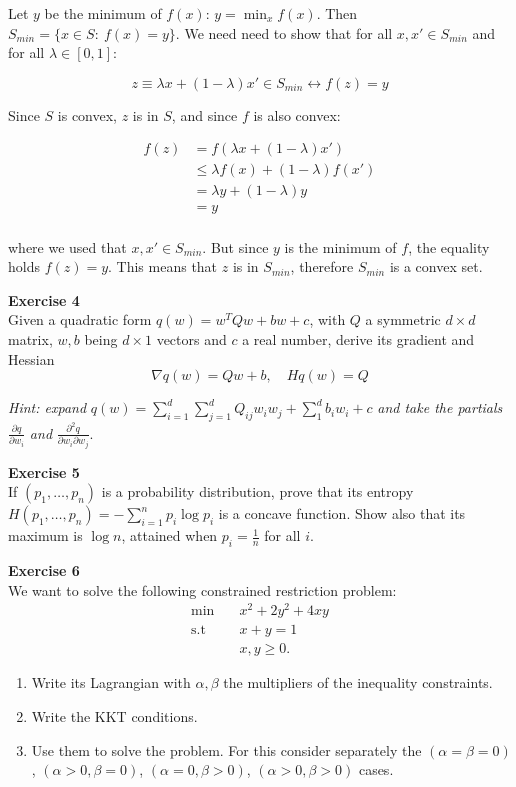 \documentclass[11pt,table]{article}
\newenvironment{problem}[2][Exercise]
    { \begin{mdframed}[backgroundcolor=gray!20] \textbf{#1 #2} \\}
    {  \end{mdframed}}
\begin{document}
Let \(y\) be the minimum of \(f(x)\): \(y = \min_x f(x)\). Then \( S_{min} = \{x \in S : \ f(x) = y \} \). We need need to show that for all \(x, x' \in S_{min}\) and for all \(\lambda \in [0,1]\):

\[
	z \equiv \lambda x + (1-\lambda) x' \in S_{min} \leftrightarrow f(z) = y
\]

Since \(S\) is convex, \(z\) is in \(S\), and since \(f\) is also convex:

\begin{align*}
	f(z) & = f\left(\lambda x + (1-\lambda) x'\right) \\
	& \leq \lambda f(x) + (1-\lambda) f(x') \\
	& = \lambda y + (1-\lambda) y \\
	& = y \\
\end{align*}

where we used that \(x, x'\in S_{min}\). But since \(y\) is the minimum of \(f\), the equality holds \(f(z) = y\). This means that \(z\) is in \(S_{min}\), therefore \(S_{min}\) is a convex set.

\begin{problem}{4}
  Given a quadratic form \( q(w) = w^TQw + bw + c \), with \( Q \) a symmetric \( d\times d \) matrix, \( w,b\) being \(d\times 1 \) vectors and \( c \) a real number, derive its gradient and Hessian
  \[
	\nabla q(w) = Qw + b, \quad Hq(w) = Q
  \]

  \emph{Hint: expand} \(q(w) = \sum_{i=1}^{d} \sum_{j=1}^{d} Q_{ij} w_{i}w_{j} + \sum_{1}^{d}b_{i}w_{i} + c\) \emph{and take the partials} \(\frac{\partial q}{\partial w_{i}}\) \emph{and} \(\frac{\partial^{2}q}{\partial w_{i}\partial w_{j}}\).
 \end{problem}




\begin{problem}{5}If \( (p_1,\dots,p_n) \) is a probability distribution, prove that its entropy \( H(p_1, \dots, p_n) = - \sum_{i=1}^n p_i \log p_i\) is a concave function. Show also that its maximum is \( \log n \), attained when \( p_i = \frac{1}{n}\) for all $i$.
\end{problem}

\begin{problem}{6}
  We want to solve the following constrained restriction problem:
  \begin{align*}
    \min \quad &  x^{2} + 2y^{2} + 4xy \\
    \text{s.t} \quad &  x + y = 1 \\
    & x,y \geq 0.
  \end{align*}
  \begin{enumerate}
    \item Write its Lagrangian with \(\alpha,\beta\) the multipliers of the inequality constraints.
    \item Write the KKT conditions.
          \item Use them to solve the problem. For this consider separately the \((\alpha = \beta = 0)\), \((\alpha > 0, \beta = 0)\), \((\alpha = 0, \beta > 0)\), \((\alpha > 0, \beta > 0)\) cases.
\end{enumerate}
\end{problem}
\end{document}
